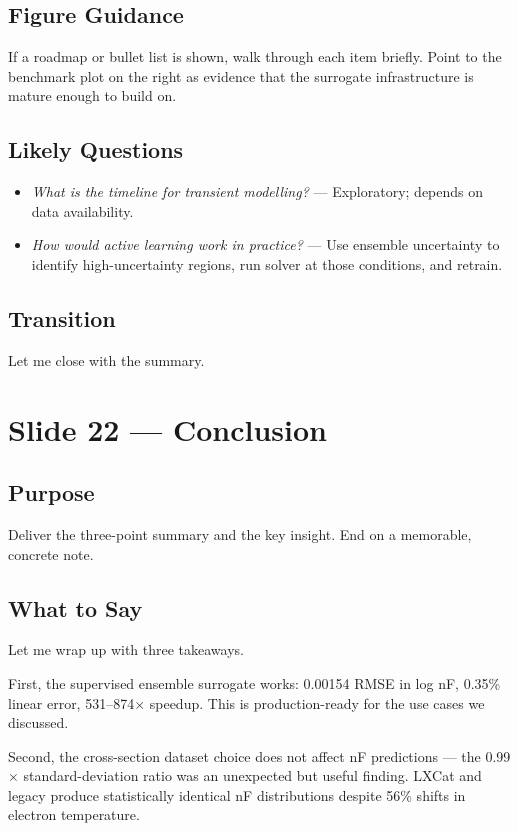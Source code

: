 \documentclass[12pt,a4paper]{article}
\begin{document}
\subsection*{Figure Guidance}
If a roadmap or bullet list is shown, walk through each item briefly.
Point to the benchmark plot on the right as evidence that the
surrogate infrastructure is mature enough to build on.

\subsection*{Likely Questions}
\begin{itemize}
  \item \emph{What is the timeline for transient modelling?}
    --- Exploratory; depends on data availability.
  \item \emph{How would active learning work in practice?}
    --- Use ensemble uncertainty to identify high-uncertainty regions,
    run solver at those conditions, and retrain.
\end{itemize}

\subsection*{Transition}
Let me close with the summary.

\clearpage

\section{Slide 22 --- Conclusion}
\label{sec:slide22}

\subsection*{Purpose}
Deliver the three-point summary and the key insight.  End on a
memorable, concrete note.

\subsection*{What to Say}

Let me wrap up with three takeaways.

First, the supervised ensemble surrogate works: 0.00154 RMSE in log
nF, 0.35\% linear error, 531--874$\times$ speedup.  This is
production-ready for the use cases we discussed.

Second, the cross-section dataset choice does not affect nF
predictions --- the 0.99$\times$ standard-deviation ratio was an
unexpected but useful finding.  LXCat and legacy produce
statistically identical nF distributions despite 56\% shifts in
electron temperature.
\end{document}
